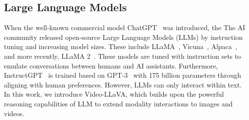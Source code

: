 \subsection{Large Language Models}

When the well-known commercial model ChatGPT~\cite{openai2023gpt4} was introduced, the The AI community released open-source Large Language Models (LLMs) by instruction tuning and increasing model sizes. These include LLaMA~\cite{touvron2023llama}, Vicuna~\cite{chiang2023vicuna}, Alpaca~\cite{taori2023stanford}, and more recently, LLaMA 2~\cite{touvron2023llama2}. These models are tuned with instruction sets to emulate conversations between humans and AI assistants. Furthermore, InstructGPT~\cite{ouyang2022training} is trained based on GPT-3~\cite{brown2020language} with 175 billion parameters through aligning with human preferences. However, LLMs can only interact within text. In this work, we introduce Video-LLaVA, which builds upon the powerful reasoning capabilities of LLM to extend modality interactions to images and videos.

